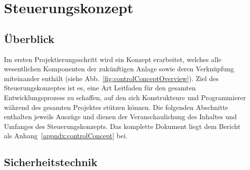 

\section{Steuerungskonzept}
\label{sec:controlConcept}

\subsection*{Überblick}

Im ersten Projektierungsschritt wird ein Konzept erarbeitet, welches alle wesentlichen Komponenten der zukünftigen Anlage sowie deren Verknüpfung miteinander enthält (siehe Abb.~\ref{fig:controlConceptOverview}). Ziel des Steuerungskonzeptes ist es, eine Art Leitfaden für den gesamten Entwicklungsprozess zu schaffen, auf den sich Konstrukteure und Programmierer während des gesamten Projektes stützen können.
Die folgenden Abschnitte enthalten jeweils Auszüge und dienen der Veranschaulichung des Inhaltes und Umfanges des Steuerungskonzepts. Das komplette Dokument liegt dem Bericht als Anhang~\ref{appndx:controlConcept} bei.


\subsection*{Sicherheitstechnik}

